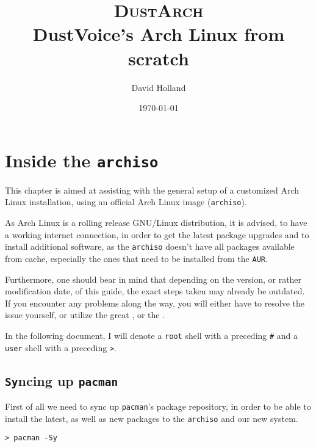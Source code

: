 \documentclass[10pt]{dustdoc}
\title{\texorpdfstring{{\scshape{\Huge DustArch}\\{\normalsize\vspace{2.5em}}}}{DustArch: }DustVoice’s Arch Linux from scratch}
\author{David Holland}
\date{\today{}}
\begin{document}
\maketitle

\tableofcontents

\chapter{Inside the \texttt{archiso}}%
\label{sec:inside-the-archiso}

This chapter is aimed at assisting with the general setup of a customized Arch Linux installation, using an official Arch Linux image (\texttt{archiso}).

\begin{NOTE}
    As Arch Linux is a rolling release GNU/Linux distribution, it is advised, to have a working internet connection, in order to get the latest package upgrades and to install additional software, as the \texttt{archiso} doesn't have all packages available from cache, especially the ones that need to be installed from the \texttt{AUR}.

    Furthermore, one should bear in mind that depending on the version, or rather modification date, of this guide, the exact steps taken may already be outdated.
    If you encounter any problems along the way, you will either have to resolve the issue yourself, or utilize the great , or the .
\end{NOTE}

\begin{NOTE}
    In the following document,
    I will denote a \texttt{root} shell with a preceding \texttt{#} and a \texttt{user} shell with a preceding \texttt{>}.
\end{NOTE}

\section{\texttt{Sy}ncing up \texttt{pacman}}%
\label{sec:syncing-up-pacman}

First of all we need to sync up \texttt{pacman}'s package repository, in order to be able to install the latest, as well as new packages to the \texttt{archiso} and our new system.

\begin{verbatim}
> pacman -Sy
\end{verbatim}
\end{document}

